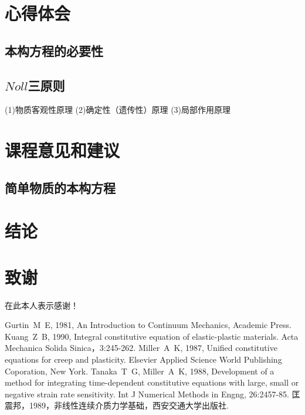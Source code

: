 \documentclass[a4paper]{cctart}
\numberwithin{equation}{section} \pagestyle{fancy}
\begin{document}
\DeclareRobustCommand\CTeX{$\mathbb{C}$\kern-.05em\TeX{}}

\section{心得体会}\label{2}
\subsection{本构方程的必要性}


\subsection{$Noll$三原则}

(1){\kaishu 物质客观性原理}
(2){\kaishu 确定性（遗传性）原理}
(3){\kaishu 局部作用原理}


\section{课程意见和建议}\label{3}



\subsection{简单物质的本构方程}


\section{结论}

\section{致谢}
在此本人表示感谢！

\begin{thebibliography}{9}
Gurtin~M~E, 1981, An Introduction to Continuum
Mechanics, Academic Press.
Kuang~Z~B, 1990, Integral constitutive equation
of elastic-plastic materials. Acta Mechanica Solida
Sinica，3:245-262.
Miller~A~K, 1987, Unified constitutive equations
for creep and plasticity. Elsevier Applied Science World
Publishing Coporation, New York.
Tanaka~T~G, Miller~A~K, 1988, Development of a
method for integrating time-dependent constitutive equations with
large, small or negative strain rate sensitivity. Int J Numerical
Methods in Engng, 26:2457-85.
 匡震邦，1989，非线性连续介质力学基础，西安交通大学出版社.
\end{thebibliography}
\end{document}
